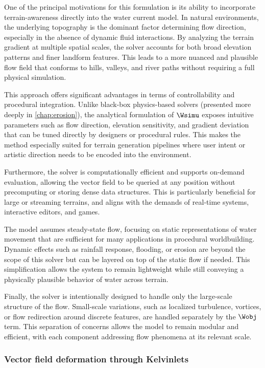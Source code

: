 One of the principal motivations for this formulation is its ability to incorporate terrain-awareness directly into the water current model. In natural environments, the underlying topography is the dominant factor determining flow direction, especially in the absence of dynamic fluid interactions. By analyzing the terrain gradient at multiple spatial scales, the solver accounts for both broad elevation patterns and finer landform features. This leads to a more nuanced and plausible flow field that conforms to hills, valleys, and river paths without requiring a full physical simulation.

This approach offers significant advantages in terms of controllability and procedural integration. Unlike black-box physics-based solvers (presented more deeply in \cref{chap:erosion}), the analytical formulation of $\Wsimu$ exposes intuitive parameters such as flow direction, elevation sensitivity, and gradient deviation that can be tuned directly by designers or procedural rules. This makes the method especially suited for terrain generation pipelines where user intent or artistic direction needs to be encoded into the environment.

Furthermore, the solver is computationally efficient and supports on-demand evaluation, allowing the vector field to be queried at any position without precomputing or storing dense data structures. This is particularly beneficial for large or streaming terrains, and aligns with the demands of real-time systems, interactive editors, and games.

The model assumes steady-state flow, focusing on static representations of water movement that are sufficient for many applications in procedural worldbuilding. Dynamic effects such as rainfall response, flooding, or erosion are beyond the scope of this solver but can be layered on top of the static flow if needed. This simplification allows the system to remain lightweight while still conveying a physically plausible behavior of water across terrain.

Finally, the solver is intentionally designed to handle only the large-scale structure of the flow. Small-scale variations, such as localized turbulence, vortices, or flow redirection around discrete features, are handled separately by the $\Wobj$ term. This separation of concerns allows the model to remain modular and efficient, with each component addressing flow phenomena at its relevant scale.

\subsubsection{Vector field deformation through Kelvinlets}

